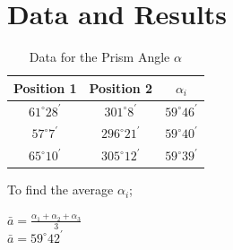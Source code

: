 \documentclass[a4paper,12pt]{report}
\begin{document}
\chapter{Data and Results}
\begin{table}[h]
\begin{center}
	\begin{tabular}{|c|c|c|}
	\hline Position 1 & Position 2 & $\alpha_{i}$ \\ 
	\hline $61^{\circ}28^{\prime}$ & $301^{\circ}8^{\prime}$ & $59^{\circ}46^{\prime}$ \\ 
	\hline $57^{\circ}7^{\prime}$ & $296^{\circ}21^{\prime}$ & $59^{\circ}40^{\prime}$ \\ 
	\hline $65^{\circ}10^{\prime}$ & $305^{\circ}12^{\prime}$ & $59^{\circ}39^{\prime}$ \\ 
	\hline 
\end{tabular} 
\end{center}
\caption{Data for the Prism Angle $\alpha$}
\end{table}
To find the average $\alpha_{i}$;
\begin{center}
	$\bar{a}=\frac{\alpha_{1}+\alpha_{2}+\alpha_{3}}{3}$ \\$\bar{a}=59^{\circ}42^{\prime}$
\end{center}
\end{document}
